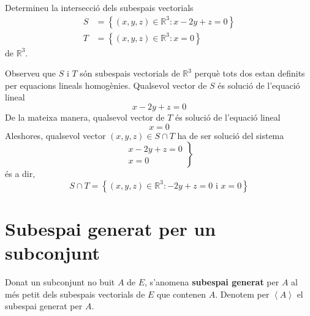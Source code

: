 \begin{exemple}
Determineu la intersecció dels subespais vectorials 
\begin{align*}
S &=\left\{ (x,y,z)\in \mathbb{R}^{3}:x-2y+z=0\right\} \\
T &=\left\{ (x,y,z)\in \mathbb{R}^{3}:x=0\right\}
\end{align*}
de $\mathbb{R}^{3}$.

\end{exemple}
\begin{solucio}
Observeu que $S$ i $T$ són subespais vectorials de 
$\mathbb{R}^{3}$ perquè tots dos estan definits per equacions lineals
homogènies. Qualsevol vector de $S$ és solució de l'equació lineal 
\begin{equation*}
x-2y+z=0
\end{equation*}%
De la mateixa manera, qualsevol vector de $T$ és solució de l'equació lineal%
\begin{equation*}
x=0
\end{equation*}%
Aleshores, qualsevol vector $(x,y,z)\in S\cap T$ ha de ser
solució del sistema%
\begin{equation*}
\left. 
\begin{array}{r}
x-2y+z=0 \\ 
x=0%
\end{array}%
\right\}
\end{equation*}%
és a dir,%
\begin{equation*}
S\cap T=\left\{ (x,y,z)\in \mathbb{R}^{3}:-2y+z=0\text{ i }%
x=0\right\}
\end{equation*}
\end{solucio}

\section{Subespai generat per un subconjunt}

\begin{definicio}
Donat un subconjunt no buit $A$ de $E$, s’anomena \textbf{%
subespai generat} per $A$ al més petit dels subespais vectorials de $%
E$ que contenen $A$. Denotem per $\left\langle A\right\rangle $
el subespai generat per $A$.
\end{definicio}

